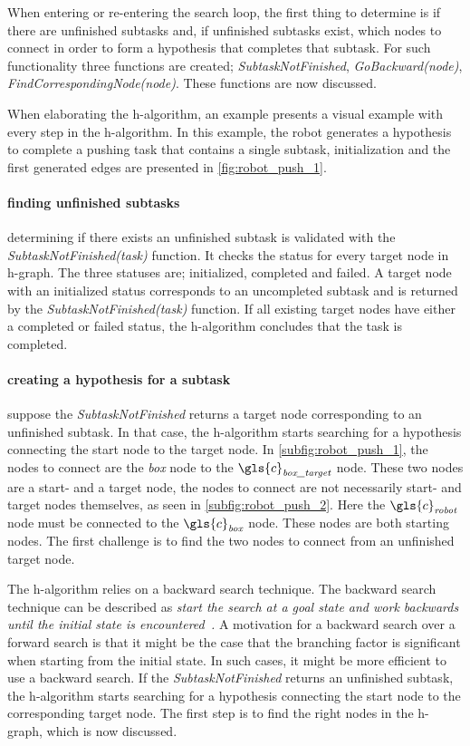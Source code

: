 When entering or re-entering the search loop, the first thing to determine is if there are unfinished subtasks and, if unfinished subtasks exist, which nodes to connect in order to form a hypothesis that completes that subtask. For such functionality three functions are created; \textit{SubtaskNotFinished}, \textit{GoBackward(\gls{node})}, \textit{FindCorrespondingNode(\gls{node})}. These functions are now discussed.\bs

When elaborating the \ac{h-algorithm}, an example presents a visual example with every step in the \ac{h-algorithm}. In this example, the robot generates a hypothesis to complete a pushing task that contains a single subtask, initialization and the first generated edges are presented in \cref{fig:robot_push_1}.\bs

\paragraph{finding unfinished subtasks}
determining if there exists an unfinished subtask is validated with the \textit{SubtaskNotFinished(\gls{task})} function. It checks the status for every target node in \ac{h-graph}. The three statuses are; initialized, completed and failed. A target node with an initialized status corresponds to an uncompleted subtask and is returned by the \textit{SubtaskNotFinished(\gls{task})} function. If all existing target nodes have either a completed or failed status, the \ac{h-algorithm} concludes that the task is completed.\bs

\paragraph{creating a hypothesis for a subtask}
suppose the \textit{SubtaskNotFinished} returns a target node corresponding to an unfinished subtask. In that case, the \ac{h-algorithm} starts searching for a hypothesis connecting the start node to the target node. In \cref{subfig:robot_push_1}, the nodes to connect are the \textit{box} node to the $\gls{c}_\textit{box\_target}$ node. These two nodes are a start- and a target node, the nodes to connect are not necessarily start- and target nodes themselves, as seen in \cref{subfig:robot_push_2}. Here the $\gls{c}_\textit{robot}$ node must be connected to the $\gls{c}_\textit{box}$ node. These nodes are both starting nodes. The first challenge is to find the two nodes to connect from an unfinished target node.\bs

 The \ac{h-algorithm} relies on a backward search technique. The backward search technique can be described as \textit{start the search at a goal state and work backwards until the initial state is encountered~\cite{lavalle_planning_2006}.} A motivation for a backward search over a forward search is that it might be the case that the branching factor is significant when starting from the initial state. In such cases, it might be more efficient to use a backward search. If the \textit{SubtaskNotFinished} returns an unfinished subtask, the \ac{h-algorithm} starts searching for a hypothesis connecting the start node to the corresponding target node. The first step is to find the right nodes in the \ac{h-graph}, which is now discussed.\bs

